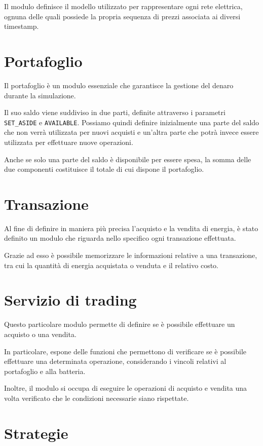 \documentclass[12pt,a4paper,oneside]{report}
\begin{document}
Il modulo definisce il modello utilizzato per rappresentare ogni rete elettrica, 
ognuna delle quali possiede la propria sequenza di prezzi associata ai diversi 
timestamp.

\section{Portafoglio}

Il portafoglio è un modulo essenziale che garantisce la gestione del denaro 
durante la simulazione.

Il suo saldo viene suddiviso in due parti, definite attraverso i parametri 
\texttt{SET\_ASIDE} e \texttt{AVAILABLE}. Possiamo quindi definire inizialmente 
una parte del saldo che non verrà utilizzata per nuovi acquisti e un'altra parte 
che potrà invece essere utilizzata per effettuare nuove operazioni.

Anche se solo una parte del saldo è disponibile per essere spesa, la somma 
delle due componenti costituisce il totale di cui dispone il portafoglio.

\section{Transazione}

Al fine di definire in maniera più precisa l'acquisto e la vendita di energia, 
è stato definito un modulo che riguarda nello specifico ogni transazione effettuata.

Grazie ad esso è possibile memorizzare le informazioni relative a una transazione, 
tra cui la quantità di energia acquistata o venduta e il relativo costo.

\section{Servizio di trading}

Questo particolare modulo permette di definire se è possibile effettuare 
un acquisto o una vendita.

In particolare, espone delle funzioni che permettono di verificare se è possibile 
effettuare una determinata operazione, considerando i vincoli relativi al 
portafoglio e alla batteria.

Inoltre, il modulo si occupa di eseguire le operazioni di acquisto e vendita 
una volta verificato che le condizioni necessarie siano rispettate.

\section{Strategie}
\end{document}
